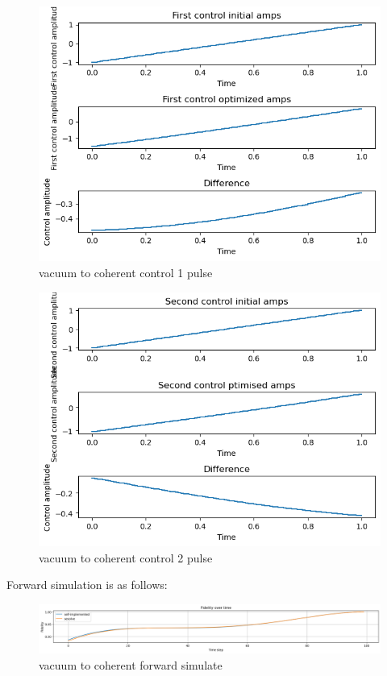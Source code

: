 \documentclass[12pt]{article}
\begin{document}
\begin{figure}[H]
    \centering
    \includegraphics[width=0.95\linewidth]{vac2coherent_control1.png}
    \caption{vacuum to coherent control 1 pulse}
    \label{fig:vac2coherent_control1}
\end{figure}
\begin{figure}[H]
    \centering
    \includegraphics[width=0.95\linewidth]{vac2coherent_control2.png}
    \caption{vacuum to coherent control 2 pulse}
    \label{fig:vac2coherent_control2}
\end{figure}

Forward simulation is as follows: 
\begin{figure}[H]
    \centering
    \includegraphics[width=0.95\linewidth]{vac2coherent_simulate.png}
    \caption{vacuum to coherent forward simulate}
    \label{fig:vac2coherent_simulate}
\end{figure}
\end{document}
